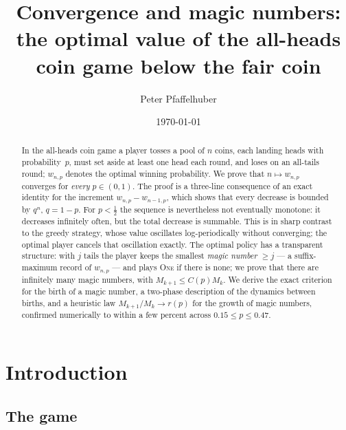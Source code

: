\documentclass[11pt]{article}
\title{Convergence and magic numbers:\\
       the optimal value of the all-heads coin game below the fair coin}
\author{Peter Pfaffelhuber}
\date{\today}
\theoremstyle{definition}
\newcommand{\One}{\textsc{One}}
\begin{document}
\maketitle

\begin{abstract}
  In the all-heads coin game a player tosses a pool of $n$ coins, each
  landing heads with probability~$p$, must set aside at least one head
  each round, and loses on an all-tails round; $w_{n,p}$ denotes the
  optimal winning probability.  We prove that $n\mapsto w_{n,p}$
  converges for \emph{every} $p\in(0,1)$.  The proof is a three-line
  consequence of an exact identity for the increment
  $w_{n,p}-w_{n-1,p}$, which shows that every decrease is bounded by
  $q^n$, $q=1-p$.  For $p<\tfrac12$ the sequence is nevertheless not
  eventually monotone: it decreases infinitely often, but the total
  decrease is summable.  This is in sharp contrast to the greedy
  strategy, whose value oscillates log-periodically without converging;
  the optimal player cancels that oscillation exactly.  The optimal
  policy has a transparent structure: with $j$ tails the player keeps
  the smallest \emph{magic number} $\ge j$ --- a suffix-maximum record
  of $w_{n,p}$ --- and plays \One{} if there is none; we prove that
  there are infinitely many magic numbers, with $M_{k+1}\le C(p)M_k$.  We derive the exact
  criterion for the birth of a magic number, a two-phase description
  of the dynamics between births, and a heuristic law
  $M_{k+1}/M_k\to r(p)$ for the growth of magic numbers, confirmed
  numerically to within a few percent across $0.15\le p\le0.47$.
\end{abstract}

\section{Introduction}\label{sec:intro}

\subsection{The game}
\end{document}
